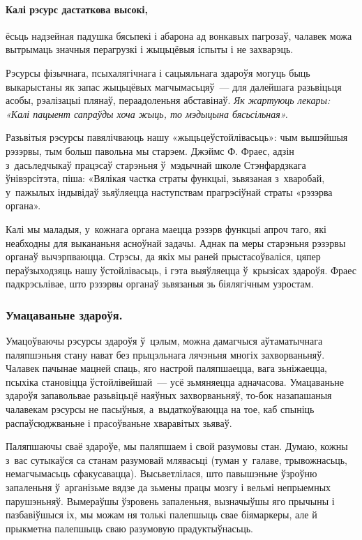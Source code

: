 \paragraph{Калі рэсурс дастаткова высокі,} ёсьць надзейная падушка бясьпекі і абарона ад вонкавых пагрозаў, чалавек можа вытрымаць значныя перагрузкі і жыцьцёвыя іспыты і не захварэць.


Рэсурсы фізычнага, псыхалягічнага і сацыяльнага здароўя могуць быць выкарыстаны як запас жыцьцёвых магчымасьцяў~--- для далейшага разьвіцьця асобы, рэалізацыі плянаў, пераадоленьня абставінаў. \emph{Як жартуюць лекары: «Калі пацыент сапраўды хоча жыць, то мэдыцына бясьсільная».}

Разьвітыя рэсурсы павялічваюць нашу «жыцьцеўстойлівасьць»: чым вышэйшыя рэзэрвы, тым больш павольна мы старэем. Джэймс Ф. Фраес, адзін з~дасьледчыкаў працэсаў старэньня ў~мэдычнай школе Стэнфардзкага ўнівэрсітэта, піша: «Вялікая частка страты функцыі, зьвязаная з~хваробай, у~пажылых індывідаў зьяўляецца наступствам прагрэсіўнай страты «рэзэрва органа». 

Калі мы маладыя, у~кожнага органа маецца рэзэрв функцыі апроч таго, які неабходны для выкананьня асноўнай задачы. Аднак па меры старэньня рэзэрвы органаў вычэрпваюцца. Стрэсы, да якіх мы раней прыстасоўваліся, цяпер пераўзыходзяць нашу ўстойлівасьць, і гэта выяўляецца ў~крызісах здароўя. Фраес падкрэсьлівае, што рэзэрвы органаў зьвязаныя зь біялягічным узростам.

\subsubsection{Умацаваньне здароўя.}

Умацоўваючы рэсурсы здароўя ў~цэлым, можна дамагчыся аўтаматычнага паляпшэньня стану нават без прыцэльнага лячэньня многіх захворваньняў. Чалавек пачынае мацней спаць, яго настрой паляпшаецца, вага зьніжаецца, псыхіка становіцца ўстойлівейшай~--- усё зьмяняецца адначасова. Умацаваньне здароўя запавольвае разьвіцьцё наяўных захворваньняў, то-бок назапашаныя чалавекам рэсурсы не пасыўныя, а~выдаткоўваюцца на тое, каб спыніць распаўсюджваньне і прасоўваньне хваравітых зьяваў.


Паляпшаючы сваё здароўе, мы паляпшаем і свой разумовы стан. Думаю, кожны з~вас сутыкаўся са станам разумовай млявасьці (туман у~галаве, трывожнасьць, немагчымасьць сфакусавацца). Высьветлілася, што павышэньне ўзроўню запаленьня ў~арганізьме вядзе да зьмены працы мозгу і вельмі непрыемных парушэньняў. Вымераўшы ўзровень запаленьня, вызначыўшы яго прычыны і пазбавіўшыся іх, мы можам ня толькі палепшыць свае біямаркеры, але й прыкметна палепшыць сваю разумовую прадуктыўнасьць. 

